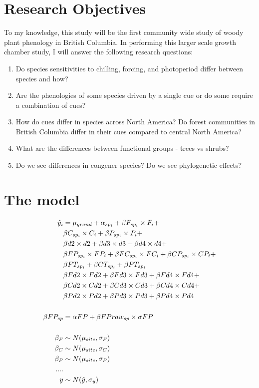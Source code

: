 \documentclass[11pt,letter]{article}
\begin{document}
\section{Research Objectives}
To my knowledge, this study will be the first community wide study of woody plant phenology in British Columbia. In performing this larger scale growth chamber study, I will answer the following research questions:
\begin{enumerate}
\item Do species sensitivities to chilling, forcing, and photoperiod differ between species and how?
\item Are the phenologies of some species driven by a single cue or do some require a combination of cues?
\item How do cues differ in species across North America? Do forest communities in British Columbia differ in their cues compared to central North America? 
\item What are the differences between functional groups - trees vs shrubs?
\item Do we see differences in congener species? Do we see phylogenetic effects? 
\end{enumerate}

\section{The model}

\begin{align*}
\hat{y}_i &=  \mu_{grand} + \alpha_{sp_i} + \beta F_{sp_i} \times F_i + \\
& \beta C_{sp_i}  \times C_i + \beta P_{sp_i}  \times P_i + \\
& \beta d2 \times d2 + \beta d3 \times d3 + \beta d4 \times d4 +\\
& \beta FP_{sp_i}  \times FP_i  + \beta FC_{sp_i}  \times FC_i + \beta CP_{sp_i}  \times CP_i + \\
& \beta FT _{sp_i} + \beta CT _{sp_i} + \beta PT _{sp_i}\\
& \beta Fd2 \times Fd2 + \beta Fd3 \times Fd3 + \beta Fd4 \times Fd4 +\\
& \beta Cd2 \times Cd2 + \beta Cd3 \times Cd3 + \beta Cd4 \times Cd4 +\\
& \beta Pd2 \times Pd2 + \beta Pd3 \times Pd3 + \beta Pd4 \times Pd4 \\
\vspace{1ex}\\
\beta FP_{sp} &= \alpha FP + \beta FPraw_{sp}  \times \sigma FP\\
\vspace{1ex}\\
\beta_{F} & \sim N(\mu_{site}, \sigma_{F}) \\
\beta_{C} & \sim N(\mu_{site}, \sigma_{C}) \\
\beta_{P} & \sim N(\mu_{site}, \sigma_{P}) \\
....\\
y & \sim N(\hat{y}, \sigma_{y}) \\
\end{align*}
\end{document}
